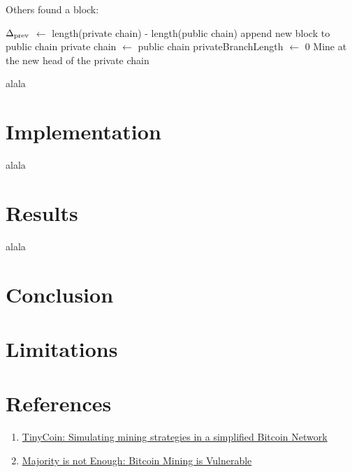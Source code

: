 \documentclass{article}
\begin{document}
\begin{algorithm}
\caption{Others found a block:}\label{selfish_mining}
\begin{algorithmic}[1]
\State $\Delta\textsubscript{prev}$ $\gets$ length(private chain) - length(public chain)
\State append new block to public chain
\State private chain $\gets$ public chain
\State privateBranchLength $\gets$ 0
\Else 
{} 
\EndIf 
\State Mine at the new head of the private chain 
\end{algorithmic}
\end{algorithm}



alala

\section{Implementation}  

alala

\section{Results}



alala


\section{Conclusion}




\section{Limitations} 


\section{References} 
\begin{enumerate}
\item \href{https://elearning.di.unipi.it/pluginfile.php/14179/mod_assign/intro/SelfishMining.pdf}{TinyCoin: Simulating mining strategies in a simplified Bitcoin Network}
\item \href{https://elearning.di.unipi.it/pluginfile.php/14179/mod_assign/intro/MajorityisNotEnough.pdf}{Majority is not Enough: Bitcoin Mining is Vulnerable}
\end{enumerate}
\end{document}
